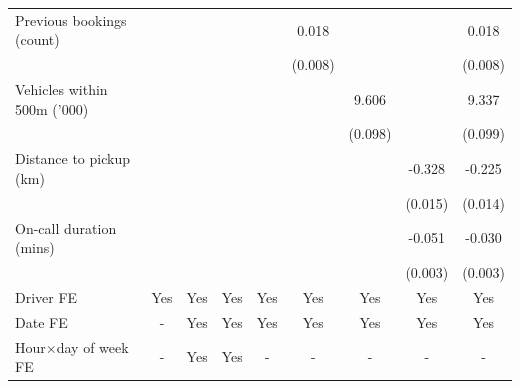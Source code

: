 \documentclass[reviewmode]{restat}
\begin{document}
\begin{appendices}
\begin{table}[h]
{\begin{tabular}{l*{8}{S}}
				\addlinespace
				Previous bookings (count)&                     &                     &                     &                     &       0.018 &                     &                     &       0.018 \\
				                    &                     &                     &                     &                     &     (0.008)         &                     &                     &     (0.008)         \\
				\addlinespace
				Vehicles within 500m ('000)&                     &                     &                     &                     &                     &       9.606&                     &       9.337\\
				                    &                     &                     &                     &                     &                     &     (0.098)         &                     &     (0.099)         \\
				\addlinespace
				Distance to pickup (km)&                     &                     &                     &                     &                     &                     &      -0.328&      -0.225\\
				                    &                     &                     &                     &                     &                     &                     &     (0.015)         &     (0.014)         \\
				\addlinespace
				On-call duration (mins)&                     &                     &                     &                     &                     &                     &      -0.051&      -0.030\\
				                    &                     &                     &                     &                     &                     &                     &     (0.003)         &     (0.003)         \\
				\addlinespace
				Driver FE           &       {Yes}         &       {Yes}         &       {Yes}         &       {Yes}         &       {Yes}         &       {Yes}         &       {Yes}         &       {Yes}         \\
				\addlinespace
				Date FE           &       {-}         &       {Yes}         &       {Yes}         &       {Yes}         &       {Yes}         &       {Yes}         &       {Yes}         &       {Yes}         \\
				\addlinespace
				Hour\(\times\)day of week FE&         {-}         &       {Yes}         &       {Yes}         &         {-}         &         {-}         &         {-}         &         {-}         &         {-}         \\

\end{tabular}}
\end{table}
\end{appendices}
\end{document}
